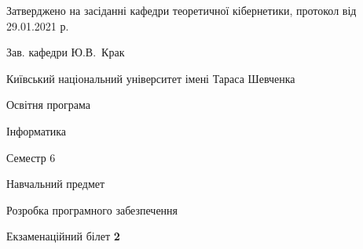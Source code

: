 \documentclass[10pt, ukrainian]{article}
\begin{document}
{\vspace{5mm}\smallskip \begin {small} Затверджено на засіданні кафедри теоретичної кібернетики, протокол  від   29.01.2021 р.\par\smallskip\smallskip
{\parbox {6.5 cm}{Зав. кафедри \dotfill Ю.В.~Крак}} \end{small}}
\newpage

{{\begin {small}\par
{ \center  Київський національний університет імені Тараса Шевченка \par}
{\parbox {5 cm}{Освітня програма \hfill}{\parbox {7 cm}{Інформатика \hfill}}\parbox {6 cm}{\hfill Семестр 6}}\par
{\parbox {5 cm} {Навчальний предмет \hfill}\parbox {7 cm}{Розробка програмного забезпечення \hfill}\parbox {6cm}{\hfill}\par}\vspace{-7pt} \end{small}}{\center Екзаменаційний білет \No \textbf
{ 2 }\par}}
\end{document}
